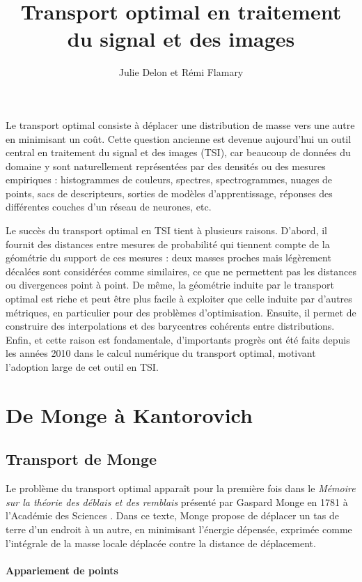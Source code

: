 \documentclass[11pt,a4paper]{article}
\title{Transport optimal en traitement du signal et des images}
\author{Julie Delon et Rémi Flamary}
\date{}
\begin{document}
\maketitle

Le transport optimal consiste à déplacer une distribution de masse vers une autre en minimisant un coût. Cette question ancienne est devenue aujourd'hui un outil central en traitement du signal et des images (TSI), car beaucoup de données du domaine y sont naturellement représentées par des densités ou des mesures empiriques : histogrammes de couleurs, spectres, spectrogrammes, nuages de points, sacs de descripteurs, sorties de modèles d'apprentissage, réponses des différentes couches d'un réseau de neurones, etc. 

Le succès du transport optimal en TSI tient à plusieurs raisons. D'abord, il fournit
des distances entre mesures de probabilité qui tiennent compte de la géométrie
du support de ces mesures : deux masses proches mais légèrement décalées sont
considérées comme similaires, ce que ne permettent pas les distances ou
divergences point à point. De même, la géométrie induite par le transport
optimal est riche et peut être plus facile à exploiter que celle induite par d'autres métriques, en particulier pour des
problèmes d'optimisation.
Ensuite, il permet de construire des interpolations et des barycentres cohérents entre distributions. Enfin, et cette raison est fondamentale, d'importants progrès ont été faits depuis les années 2010 dans le calcul numérique du transport optimal, motivant l'adoption large de cet outil en TSI.  

\section{De Monge à Kantorovich}
\subsection{Transport de Monge}

Le problème du transport optimal apparaît pour la première fois dans le \textit{Mémoire sur la théorie des déblais et des remblais} présenté par Gaspard Monge en 1781 à l'Académie des Sciences \cite{Monge1781}. Dans ce texte, Monge propose de déplacer un tas de terre d'un endroit à un autre, en minimisant l'énergie dépensée, exprimée comme l'intégrale de la masse locale déplacée contre la distance de déplacement.   

\paragraph{Appariement de points}
\end{document}
